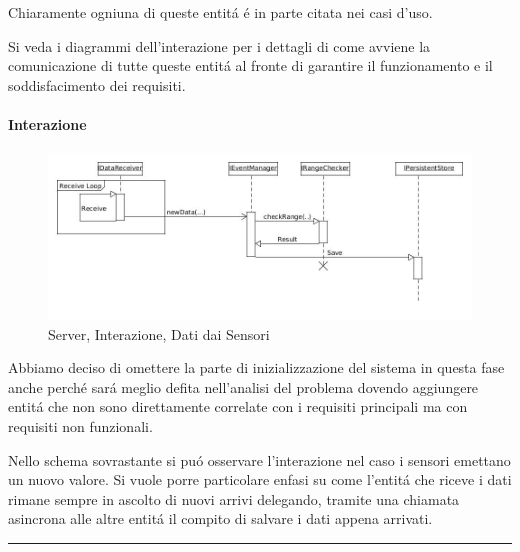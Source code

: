 Chiaramente ogniuna di queste entit\'a \'e in parte citata nei casi d'uso.

Si veda i diagrammi dell'interazione per i dettagli di come avviene la comunicazione di tutte queste entit\'a al fronte di garantire il funzionamento e il soddisfacimento dei requisiti.

\paragraph{Interazione}

\begin{figure}[H]
\centering
\includegraphics[width=\textwidth]{Figures/DomainModel/Server/NewDataInteraction.jpg}
\caption{Server, Interazione, Dati dai Sensori}
\end{figure}

Abbiamo deciso di omettere la parte di inizializzazione del sistema in questa fase anche perch\'e sar\'a meglio defita nell'analisi del problema dovendo aggiungere entit\'a che non sono direttamente correlate con i requisiti principali ma con requisiti non funzionali.

Nello schema sovrastante si pu\'o osservare l'interazione nel caso i sensori emettano un nuovo valore. Si vuole porre particolare enfasi su come l'entit\'a che riceve i dati rimane sempre in ascolto di nuovi arrivi delegando, tramite una chiamata asincrona alle altre entit\'a il compito di salvare i dati appena arrivati.

\noindent\rule[0.5ex]{\linewidth}{1pt}

